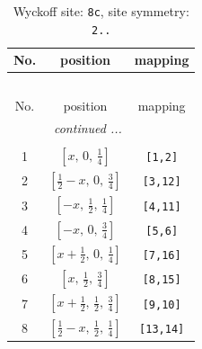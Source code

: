 \documentclass[fleqn,8pt]{jsarticle}
\begin{document}
\begin{longtable}{ccc}
\caption{Wyckoff site: {\tt 8c}, site symmetry: {\tt 2..}}
 \\
 \hline \hline
No. & position & mapping \\ \hline \endfirsthead

\multicolumn{2}{l}{\tablename\ \thetable{}} \\
 \hline \hline
No. & position & mapping \\ \hline \endhead

 \hline \hline
\multicolumn{2}{r}{\footnotesize\it continued ...} \\ \endfoot

 \hline \hline
\multicolumn{2}{r}{} \\ \endlastfoot

1 & $\left[ x,\, 0,\, \frac{1}{4} \right]$ & {\tt [1,2]} \\ \hline
2 & $\left[ \frac{1}{2} - x,\, 0,\, \frac{3}{4} \right]$ & {\tt [3,12]} \\ \hline
3 & $\left[ - x,\, \frac{1}{2},\, \frac{1}{4} \right]$ & {\tt [4,11]} \\ \hline
4 & $\left[ - x,\, 0,\, \frac{3}{4} \right]$ & {\tt [5,6]} \\ \hline
5 & $\left[ x + \frac{1}{2},\, 0,\, \frac{1}{4} \right]$ & {\tt [7,16]} \\ \hline
6 & $\left[ x,\, \frac{1}{2},\, \frac{3}{4} \right]$ & {\tt [8,15]} \\ \hline
7 & $\left[ x + \frac{1}{2},\, \frac{1}{2},\, \frac{3}{4} \right]$ & {\tt [9,10]} \\ \hline
8 & $\left[ \frac{1}{2} - x,\, \frac{1}{2},\, \frac{1}{4} \right]$ & {\tt [13,14]} \\
\end{longtable}
\renewcommand{\arraystretch}{1.2}
\end{document}
